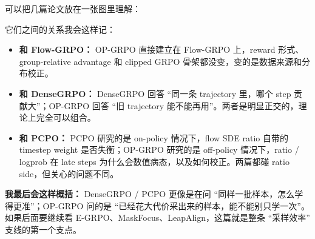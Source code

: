 可以把几篇论文放在一张图里理解：

\begin{center}
\end{center}

它们之间的关系我会这样记：

\begin{itemize}[leftmargin=1.5em]
  \item \textbf{和 Flow-GRPO：} OP-GRPO 直接建立在 Flow-GRPO 上，reward 形式、group-relative advantage 和 clipped GRPO 骨架都没变，变的是数据来源和分布校正。
  \item \textbf{和 DenseGRPO：} DenseGRPO 回答 ``同一条 trajectory 里，哪个 step 贡献大''；OP-GRPO 回答 ``旧 trajectory 能不能再用''。两者是明显正交的，理论上完全可以组合。
  \item \textbf{和 PCPO：} PCPO 研究的是 on-policy 情况下，flow SDE ratio 自带的 timestep weight 是否失衡；OP-GRPO 研究的是 off-policy 情况下，ratio / logprob 在 late steps 为什么会数值病态，以及如何校正。两篇都碰 ratio side，但关心的问题不同。
\end{itemize}

\begin{summarybox}
\textbf{我最后会这样概括：} DenseGRPO / PCPO 更像是在问 ``同样一批样本，怎么学得更准''；OP-GRPO 问的是 ``已经花大代价采出来的样本，能不能别只学一次''。如果后面要继续看 E-GRPO、MaskFocus、LeapAlign，这篇就是整条 ``采样效率'' 支线的第一个支点。
\end{summarybox}
